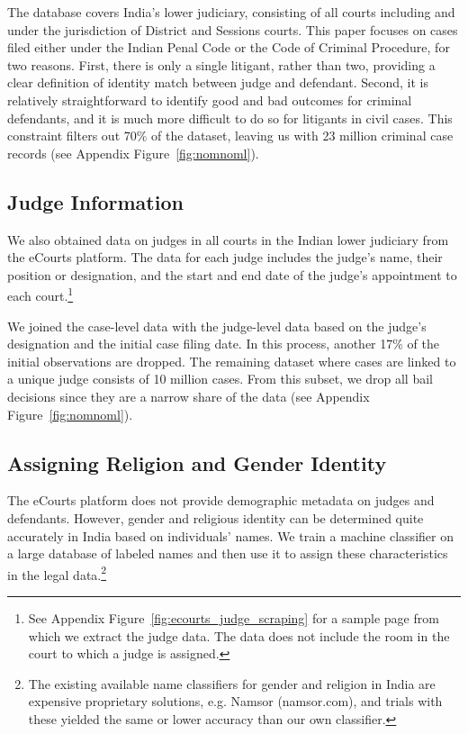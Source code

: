 \documentclass[12pt,english]{article}
\begin{document}
The database covers India's lower judiciary, consisting of all courts including and under the jurisdiction of District and Sessions courts. This paper focuses on cases filed either under the Indian Penal Code or the Code of Criminal Procedure, for two reasons. First, there is only a single litigant, rather than two, providing a clear definition of identity match between judge and defendant. Second, it is relatively straightforward to identify good and bad outcomes for criminal defendants, and it is much more difficult to do so for litigants in civil cases. This constraint filters out 70\% of the dataset, leaving us with 23 million criminal case records (see Appendix Figure~\ref{fig:nomnoml}). 

\subsection{Judge Information}

We also obtained data on judges in all courts in the Indian lower judiciary from the eCourts platform. The data for each judge includes the judge's name, their position or designation, and the start and end date of the judge's appointment to each court.\footnote{See Appendix Figure~\ref{fig:ecourts_judge_scraping} for a sample page from which we extract the judge data. The data does not include the room in the court to which a judge is assigned.}

We joined the case-level data with the judge-level data based on the judge's designation and the initial case filing date. In this process, another 17\% of the initial observations are dropped. The remaining dataset where cases are linked to a unique judge consists of 10 million cases. From this subset, we drop all bail decisions since they are a narrow share of the data (see Appendix Figure~\ref{fig:nomnoml}).

\subsection{Assigning Religion and Gender Identity}

The eCourts platform does not provide demographic metadata on judges and defendants. However, gender and religious identity can be determined quite accurately in India based on individuals' names. We train a machine classifier on a large database of labeled names and then use it to assign these characteristics in the legal data.\footnote{The existing available name classifiers for gender and religion in India are expensive proprietary solutions, e.g. Namsor (namsor.com), and trials with these yielded the same or lower accuracy than our own classifier.}
\end{document}
